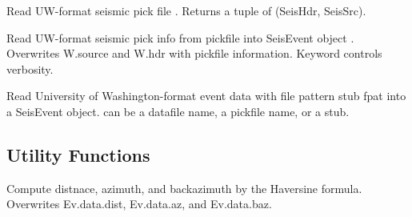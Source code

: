 \documentclass[letterpaper,11pt,english]{sphinxmanual}
\begin{document}
\begin{fulllineitems}
\label{\detokenize{src/Submodules/quake:uwpf}}
\end{fulllineitems}


Read UW-format seismic pick file . Returns a tuple of (SeisHdr, SeisSrc).


\begin{fulllineitems}
\end{fulllineitems}


Read UW-format seismic pick info from pickfile  into SeisEvent object .
Overwrites W.source and W.hdr with pickfile information. Keyword  controls
verbosity.

\begin{fulllineitems}
\label{\detokenize{src/Submodules/quake:readuwevt}}
Read University of Washington-format event data with file pattern stub fpat
into a SeisEvent object.  can be a datafile name, a pickfile name, or
a stub.

\end{fulllineitems}



\subsection{Utility Functions}
\label{\detokenize{src/Submodules/quake:utility-functions}}

\begin{fulllineitems}
\end{fulllineitems}


Compute distnace, azimuth, and backazimuth by the Haversine formula.
Overwrites Ev.data.dist, Ev.data.az, and Ev.data.baz.

\begin{fulllineitems}
\label{\detokenize{src/Submodules/quake:gcdist}}
\end{fulllineitems}
\end{document}
